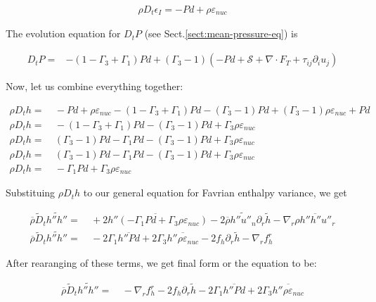 \documentclass[10pt,paper=a4]{report}
\newcommand{\eht}{\overline}
\newcommand{\fht}{\widetilde}
\begin{document}
\begin{align}
\rho D_t \epsilon_I = -P d + \rho \varepsilon_{nuc}
\end{align}  

\noindent
The evolution equation for $D_t P$ (see Sect.\ref{sect:mean-pressure-eq}) is 

\begin{align}
D_t P = & -(1-\Gamma_3+\Gamma_1)Pd + (\Gamma_3 -1)(-Pd + {\mathcal S} + \nabla \cdot F_T + \tau_{ij}\partial_i u_j)
\end{align}

\noindent
Now, let us combine everything together:

\begin{align}
  \rho D_t h = & \ - P d + \rho \varepsilon_{nuc} - (1-\Gamma_3+\Gamma_1)Pd - (\Gamma_3 -1)P d + (\Gamma_3-1)\rho \varepsilon_{nuc} + P d \\
  \rho D_t h = & \ - (1-\Gamma_3+\Gamma_1)Pd - (\Gamma_3 -1)P d + \Gamma_3 \rho \varepsilon_{nuc} \\
  \rho D_t h = & \ (\Gamma_3 -1)Pd - \Gamma_1 P d - (\Gamma_3-1)Pd + \Gamma_3 \rho \varepsilon_{nuc} \\
  \rho D_t h = & \ (\Gamma_3 -1)Pd - \Gamma_1 P d - (\Gamma_3-1)Pd + \Gamma_3 \rho \varepsilon_{nuc} \\
\rho D_t h = & \ -\Gamma_1 P d + \Gamma_3 \rho \varepsilon_{nuc}  
\end{align}  

\noindent
Substituing $\rho D_t h$ to our general equation for Favrian enthalpy variance, we get

\begin{align}
  \eht{\rho} \fht{D}_t \fht{h''h''} = & \ +\eht{2 h''(-\Gamma_1 P d + \Gamma_3 \rho \varepsilon_{nuc} )} - 2 \eht{\rho} \fht{h''u''_n}\partial_r \fht{h} - \nabla_r \eht{\rho h''h''u''_r} \\
   \eht{\rho} \fht{D}_t \fht{h''h''} = & \ -2\Gamma_1 \eht{h'' P d} + 2\Gamma_3 \eht{h'' \rho \varepsilon_{nuc}} - 2 f_h \partial_r \fht{h} - \nabla_r f_h^r
\end{align}

\noindent
After rearanging of these terms, we get final form or the equation to be:

\begin{align}
 \eht{\rho} \fht{D}_t \fht{h''h''} = & \ - \nabla_r f_h^r - 2 f_h \partial_r \fht{h} - 2\Gamma_1 \eht{h'' P d} + 2\Gamma_3 \eht{h'' \rho \varepsilon_{nuc}}
\end{align}
  
\end{document}

